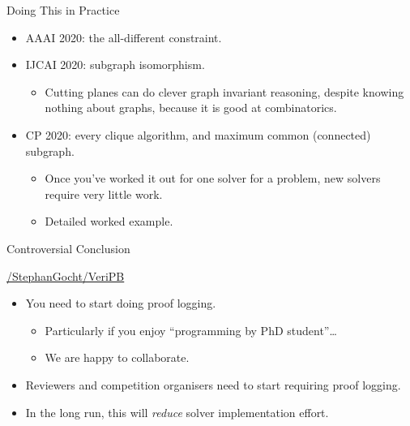 \documentclass{beamer}
\begin{document}
\begin{frame}{Doing This in Practice}
    \begin{itemize}
        \item AAAI 2020: the all-different constraint.
        \item IJCAI 2020: subgraph isomorphism.
            \begin{itemize}
                \item Cutting planes can do clever graph invariant reasoning, despite knowing
                    nothing about graphs, because it is good at combinatorics.
            \end{itemize}
        \item CP 2020: every clique algorithm, and maximum common (connected) subgraph.
            \begin{itemize}
                \item Once you've worked it out for one solver for a problem, new solvers require
                    very little work.
                \item Detailed worked example.
            \end{itemize}
    \end{itemize}
\end{frame}

\begin{frame}{Controversial Conclusion}
    \begin{center}
        \url{/StephanGocht/VeriPB}
    \end{center}
    \bigskip
    \begin{itemize}
        \item \textcolor{uofgcobalt}{You} need to start doing proof logging.
            \begin{itemize}
                \item Particularly if you enjoy ``programming by PhD student''\ldots
                \item We are happy to collaborate.
            \end{itemize}
        \item Reviewers and competition organisers need to start requiring proof logging.
        \item In the long run, this will \emph{reduce} solver implementation effort.
    \end{itemize}
\end{frame}
\end{document}
